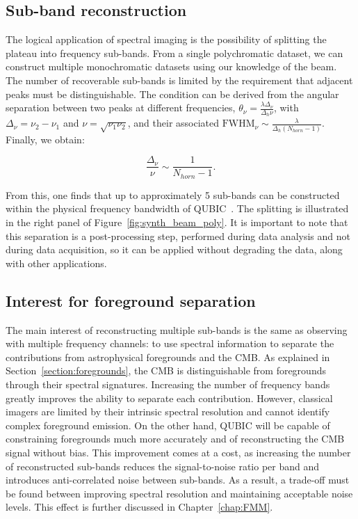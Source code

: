 \documentclass[../../thesis.tex]{subfiles}
\begin{document}
\subsection{Sub-band reconstruction}

The logical application of spectral imaging is the possibility of splitting the plateau into frequency sub-bands. From a single polychromatic dataset, we can construct multiple monochromatic datasets using our knowledge of the beam. The number of recoverable sub-bands is limited by the requirement that adjacent peaks must be distinguishable. The condition can be derived from the angular separation between two peaks at different frequencies, $\theta_\nu = \frac{\lambda\Delta_\nu}{\Delta_h\nu}$, with $\Delta_\nu = \nu_2 - \nu_1$ and $\nu = \sqrt{\nu_1\nu_2}$, and their associated $\mathrm{FWHM}_\nu \sim \frac{\lambda}{\Delta_h (N_{horn}-1)}$. Finally, we obtain:

\begin{equation} \label{eq:spectral_resolution}
    \frac{\Delta_\nu}{\nu} \sim \frac{1}{N_{horn}-1}.
\end{equation}

From this, one finds that up to approximately 5 sub-bands can be constructed within the physical frequency bandwidth of QUBIC~\cite{QUBICII,thesislouise}. The splitting is illustrated in the right panel of Figure~\ref{fig:synth_beam_poly}.
It is important to note that this separation is a post-processing step, performed during data analysis and not during data acquisition, so it can be applied without degrading the data, along with other applications.

\subsection{Interest for foreground separation}

The main interest of reconstructing multiple sub-bands is the same as observing with multiple frequency channels: to use spectral information to separate the contributions from astrophysical foregrounds and the CMB. As explained in Section~\ref{section:foregrounds}, the CMB is distinguishable from foregrounds through their spectral signatures. Increasing the number of frequency bands greatly improves the ability to separate each contribution. However, classical imagers are limited by their intrinsic spectral resolution and cannot identify complex foreground emission. On the other hand, QUBIC will be capable of constraining foregrounds much more accurately and of reconstructing the CMB signal without bias.
This improvement comes at a cost, as increasing the number of reconstructed sub-bands reduces the signal-to-noise ratio per band and introduces anti-correlated noise between sub-bands. As a result, a trade-off must be found between improving spectral resolution and maintaining acceptable noise levels. This effect is further discussed in Chapter~\ref{chap:FMM}.
\end{document}
